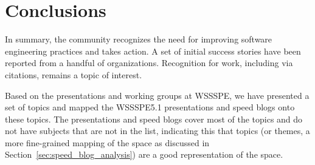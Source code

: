 \documentclass[11pt,letterpaper]{article}
\newcommand{\katznote}[1]{ {\textcolor{magenta}    { ***Dan: #1 }}}
\newcommand{\LXnote}[1]{  {\textcolor{orange}      { ***Alex: #1 }}}
\begin{document}
\section{Conclusions} \label{sec:conclusions}

In summary, the community recognizes the need for improving software engineering practices and takes action. A set of initial success stories have been reported from a handful of organizations. Recognition for work, including via citations, remains a topic of interest. 

Based on the presentations and working groups at WSSSPE, we have presented a set of topics and mapped the WSSSPE5.1 presentations and speed blogs onto these topics. The presentations and speed blogs cover most of the topics and do not have subjects that are not in the list, indicating this that topics (or themes, a more fine-grained mapping of the space as discussed in Section~\ref{sec:speed_blog_analysis}) are a good representation of the space.





\newpage



\end{document}
